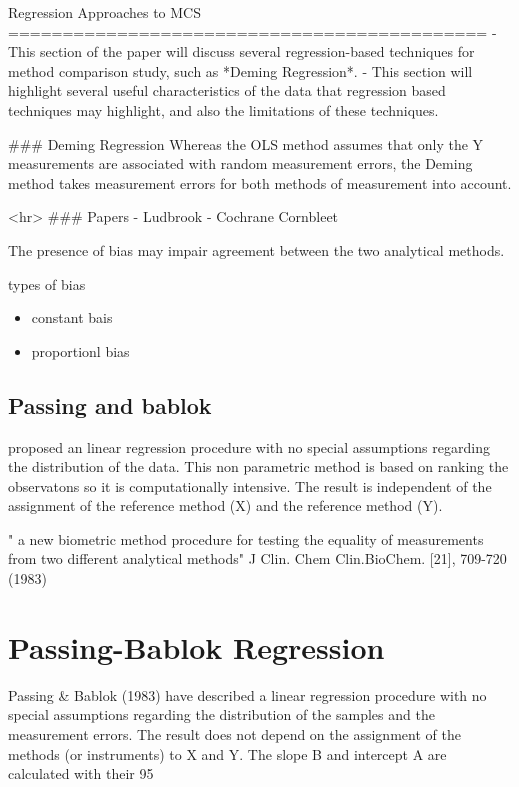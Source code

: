 Regression Approaches to MCS
============================================
- This section of the paper will discuss several regression-based techniques for method comparison study, 
such as *Deming Regression*. 
- This section will highlight several useful characteristics of the data that 
regression based techniques may highlight, and also the limitations of these techniques.

### Deming Regression
Whereas the OLS method assumes that only the Y measurements are associated with 
random measurement errors, the Deming method takes measurement errors for both methods of measurement into account.

<hr>
### Papers
- Ludbrook
- Cochrane Cornbleet



The presence of bias may impair agreement between the two analytical methods.

types of bias

\begin{itemize}
	\item constant bais
	\item proportionl bias
\end{itemize}

\subsection{Passing and bablok}
proposed an linear regression procedure with no special assumptions regarding the distribution of the data.
This non parametric method is based on ranking the observatons so it is computationally intensive.
The result is independent of the assignment of the reference method (X) and the reference method (Y).

" a new biometric method procedure for testing the equality of measurements from two different analytical methods"
J Clin. Chem Clin.BioChem. [21], 709-720 (1983)
\section{Passing-Bablok Regression}


Passing & Bablok (1983) have described a linear regression procedure with no special assumptions regarding the distribution of the samples and the measurement errors. The result does not depend on the assignment of the methods (or instruments) to X and Y. The slope B and intercept A are calculated with their 95%

